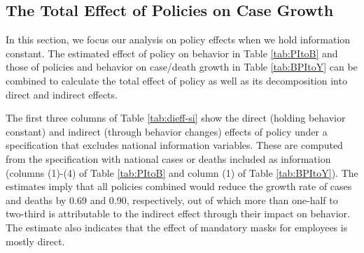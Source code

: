 \documentclass[11pt,reqno,letter]{amsart}
\theoremstyle{definition}
\renewcommand{\to}{{\rightarrow}}
\def\bcolor{\color{ForestGreen}}
\def\pcolor{\color{blue}}
\begin{document}
%    


\subsection{The Total Effect of Policies on Case Growth\label{total-policy-effect}}


In this section, we focus our analysis on policy effects when we hold
information constant. The estimated effect of policy on
behavior in Table \ref{tab:PItoB} and those of policies and
behavior on case/death growth in Table  \ref{tab:BPItoY}  can be
combined to calculate the total effect of policy as well as its
decomposition into  direct and indirect effects.

The first three columns of Table \ref{tab:dieff-si} show the direct
(holding behavior constant) and indirect (through behavior changes)
effects of policy under a specification that excludes national information variables. These are computed from the specification with
national cases or deaths included as information (columns (1)-(4) of
Table \ref{tab:PItoB} and column (1) of Table \ref{tab:BPItoY}). The estimates imply
that all policies combined would reduce the growth rate of cases  and deaths by
0.69 and 0.90, respectively,   out of which more than one-half to
two-third is attributable to the indirect effect through their impact on behavior.  The estimate also indicates that the
effect of mandatory masks for employees is mostly direct.
\end{document}
